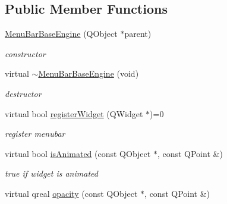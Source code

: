 \subsection*{Public Member Functions}
\begin{DoxyCompactItemize}
\item 
\mbox{\label{class_menu_bar_base_engine_a51611e10a61d86264b8bbd9f4824982b}} 
\hyperlink{class_menu_bar_base_engine_a51611e10a61d86264b8bbd9f4824982b}{Menu\+Bar\+Base\+Engine} (Q\+Object $\ast$parent)
\begin{DoxyCompactList}\small\item\em constructor \end{DoxyCompactList}\item 
\mbox{\label{class_menu_bar_base_engine_aded790b92fc9eb7851d43d9bbde6814b}} 
virtual \hyperlink{class_menu_bar_base_engine_aded790b92fc9eb7851d43d9bbde6814b}{$\sim$\+Menu\+Bar\+Base\+Engine} (void)
\begin{DoxyCompactList}\small\item\em destructor \end{DoxyCompactList}\item 
\mbox{\label{class_menu_bar_base_engine_a01ac64d3b58a16d508046709282eb345}} 
virtual bool \hyperlink{class_menu_bar_base_engine_a01ac64d3b58a16d508046709282eb345}{register\+Widget} (Q\+Widget $\ast$)=0
\begin{DoxyCompactList}\small\item\em register menubar \end{DoxyCompactList}\item 
\mbox{\label{class_menu_bar_base_engine_a10b83778c93ff6c22e73ae3313c6db47}} 
virtual bool \hyperlink{class_menu_bar_base_engine_a10b83778c93ff6c22e73ae3313c6db47}{is\+Animated} (const Q\+Object $\ast$, const Q\+Point \&)
\begin{DoxyCompactList}\small\item\em true if widget is animated \end{DoxyCompactList}\item 
\mbox{\label{class_menu_bar_base_engine_ad19ac831af0b9f137fc4c295012c743f}} 
virtual qreal \hyperlink{class_menu_bar_base_engine_ad19ac831af0b9f137fc4c295012c743f}{opacity} (const Q\+Object $\ast$, const Q\+Point \&)

\end{DoxyCompactItemize}
